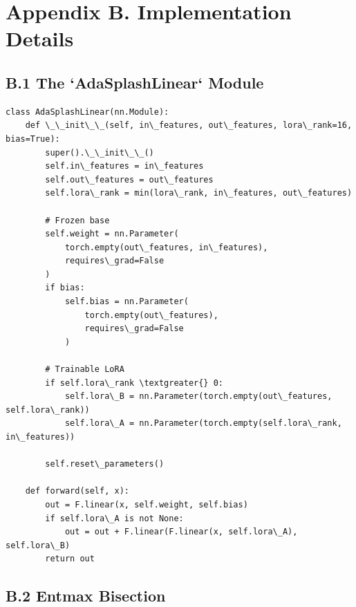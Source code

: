 
\section{Appendix B. Implementation Details}

\subsection{B.1 The `AdaSplashLinear` Module}

\begin{lstlisting}
class AdaSplashLinear(nn.Module):
    def \_\_init\_\_(self, in\_features, out\_features, lora\_rank=16, bias=True):
        super().\_\_init\_\_()
        self.in\_features = in\_features
        self.out\_features = out\_features
        self.lora\_rank = min(lora\_rank, in\_features, out\_features)
        
        # Frozen base
        self.weight = nn.Parameter(
            torch.empty(out\_features, in\_features),
            requires\_grad=False
        )
        if bias:
            self.bias = nn.Parameter(
                torch.empty(out\_features),
                requires\_grad=False
            )
        
        # Trainable LoRA
        if self.lora\_rank \textgreater{} 0:
            self.lora\_B = nn.Parameter(torch.empty(out\_features, self.lora\_rank))
            self.lora\_A = nn.Parameter(torch.empty(self.lora\_rank, in\_features))
        
        self.reset\_parameters()
    
    def forward(self, x):
        out = F.linear(x, self.weight, self.bias)
        if self.lora\_A is not None:
            out = out + F.linear(F.linear(x, self.lora\_A), self.lora\_B)
        return out
\end{lstlisting}

\subsection{B.2 Entmax Bisection}

